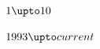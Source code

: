 \documentclass[a4paper,10pt,fleqn]{article}
\begin{document}
\noindent
$1 \upto 10$


\noindent
$1993 \upto current$
\end{document}
